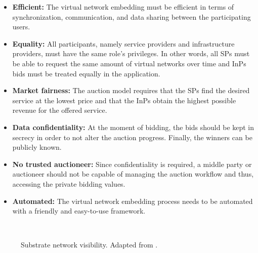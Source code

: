 \begin{itemize}
    \item \textbf{Efficient:} The virtual network embedding must be efficient in terms of synchronization, communication, and data sharing between the participating users.
    \item \textbf{Equality:} All participants, namely service providers and infrastructure providers, must have the same role's privileges. In other words, all SPs must be able to request the same amount of virtual networks over time and InPs bids must be treated equally in the application.
    \item \textbf{Market fairness:} The auction model requires that the SPs find the desired service at the lowest price and that the InPs obtain the highest possible revenue for the offered service.
    \item \textbf{Data confidentiality:} At the moment of bidding, the bids should be kept in secrecy in order to not alter the auction progress. Finally, the winners can be publicly known.
    \item \textbf{No trusted auctioneer:} Since confidentiality is required, a middle party or auctioneer should not be capable of managing the auction workflow and thus, accessing the private bidding values.
     \item \textbf{Automated:} The virtual network embedding process needs to be automated with a friendly and easy-to-use framework.
\end{itemize}

\begin{figure}[bth]
	\myfloatalign
	 \quad
	 \\
	\caption{Substrate network visibility. Adapted from \citep{dietrich2015multi}.}
	\label{fig:problem}
\end{figure}

